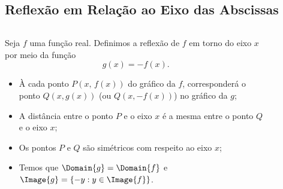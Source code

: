 \subsection{Reflexão em Relação ao Eixo das Abscissas}
\begin{frame}
  \begin{columns}[onlytextwidth]
    \begin{column}{0.49\textwidth}\vspace*{-0.5cm}
      \begin{definition}
        Seja $f$ uma função real. Definimos a reflexão de $f$ em torno do eixo $x$ por meio da função
        \begin{equation*}
          g(x) = -f(x).
        \end{equation*}
      \end{definition}
      \begin{itemize}
        \item À cada ponto $P(x,\,f(x))$ do gráfico da $f$, corresponderá o ponto $Q(x,g(x))$ (ou $Q(x,-f(x))$) no gráfico da $g$;
        \item A distância entre o ponto $P$ e o eixo $x$ é a mesma entre o ponto $Q$ e o eixo $x$;
        \item Os pontos $P$ e $Q$ são simétricos com respeito ao eixo $x$;
        \item Temos que $\Domain{g} = \Domain{f}$ e $\Image{g}=\{-y:y\in\Image{f}\}$.
      \end{itemize}
    \end{column}
    \begin{column}{0.49\textwidth}
      \begin{figure}
      \end{figure}
    \end{column}
  \end{columns}
\end{frame}

